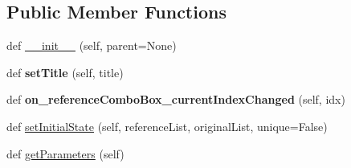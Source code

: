 \subsection*{Public Member Functions}
\begin{DoxyCompactItemize}
\item 
def \mbox{\hyperlink{class_dsg_tools_1_1_custom_widgets_1_1custom_snaper_parameter_selector_1_1_custom_snaper_parameter_selector_a76780d20a1bd9b2f4fb068c526c94bda}{\+\_\+\+\_\+init\+\_\+\+\_\+}} (self, parent=None)
\item 
\mbox{\label{class_dsg_tools_1_1_custom_widgets_1_1custom_snaper_parameter_selector_1_1_custom_snaper_parameter_selector_ac1ddcfa58a9438272ec2f4ff420df754}} 
def {\bfseries set\+Title} (self, title)
\item 
\mbox{\label{class_dsg_tools_1_1_custom_widgets_1_1custom_snaper_parameter_selector_1_1_custom_snaper_parameter_selector_a5de5b98850440d4613d00d62617adf42}} 
def {\bfseries on\+\_\+reference\+Combo\+Box\+\_\+current\+Index\+Changed} (self, idx)
\item 
def \mbox{\hyperlink{class_dsg_tools_1_1_custom_widgets_1_1custom_snaper_parameter_selector_1_1_custom_snaper_parameter_selector_a7f9ee4776c0c617b476c6db482f1c671}{set\+Initial\+State}} (self, reference\+List, original\+List, unique=False)
\item 
def \mbox{\hyperlink{class_dsg_tools_1_1_custom_widgets_1_1custom_snaper_parameter_selector_1_1_custom_snaper_parameter_selector_a28f3e04af9922baba2a53f69fe451a0c}{get\+Parameters}} (self)
\end{DoxyCompactItemize}
